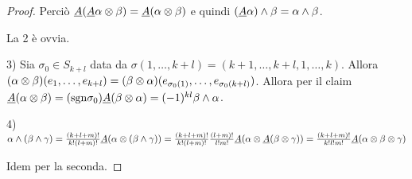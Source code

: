 \begin{proof}
	Perciò $\antisimm(\antisimm\alpha\otimes \beta) = \antisimm(\alpha\otimes\beta)$ e quindi $(\antisimm\alpha)\wedge\beta = \alpha\wedge\beta$.
	
	La 2 è ovvia.
	
	3) 
	Sia $\sigma_0\in S_{k+l}$ data da $\sigma(1,\ldots,k+l) = (k+1,\ldots,k+l,1,\ldots,k)$. Allora $(\alpha\otimes \beta)(\seqb{e}{k+l}{,}) = (\beta\otimes \alpha)(e_{\sigma_0(1)},\ldots,e_{\sigma_0(k+l)})$.
	Allora per il claim $\antisimm(\alpha\otimes\beta) = (\sgn\sigma_0) \antisimm(\beta\otimes\alpha)=(-1)^{kl} \beta \wedge \alpha$.

	4)
	$\alpha\wedge(\beta\wedge\gamma) = \frac{(k+l+m)!}{k!(l+m)!}\antisimm(\alpha\otimes(\beta\wedge\gamma)) = \frac{(k+l+m)!}{k!(l+m)!} \frac{(l+m)!}{l!m!} \antisimm(\alpha\otimes\antisimm(\beta\otimes\gamma))= \frac{(k+l+m)!}{k!l!m!}\antisimm(\alpha\otimes\beta\otimes\gamma)$
	
	Idem per la seconda.

\end{proof}





